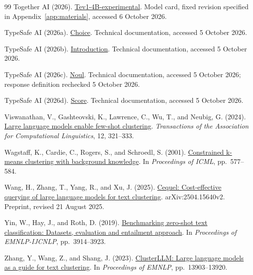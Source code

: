 \documentclass[UTF8,a4paper,zihao=-4,fontset=fandol]{ctexart}
\begin{document}
\begin{thebibliography}{99}
Together AI (2026).
\href{https://huggingface.co/togethercomputer/Tev1-4B-experimental/tree/0b7becf017daa0e5eb222f8ce7483c8c8259c52f}{Tev1-4B-experimental}.
Model card, fixed revision specified in Appendix~\ref{app:materials}, accessed 6 October 2026.

TypeSafe AI (2026a).
\href{https://docs.typesafe.ai/primitives/choice}{Choice}.
Technical documentation, accessed 5 October 2026.

TypeSafe AI (2026b).
\href{https://docs.typesafe.ai/introduction}{Introduction}.
Technical documentation, accessed 5 October 2026.

TypeSafe AI (2026c).
\href{https://docs.typesafe.ai/primitives/noul}{Noul}.
Technical documentation, accessed 5 October 2026; response definition rechecked 5 October 2026.

TypeSafe AI (2026d).
\href{https://docs.typesafe.ai/primitives/score}{Score}.
Technical documentation, accessed 5 October 2026.

Viswanathan, V., Gashteovski, K., Lawrence, C., Wu, T., and Neubig, G. (2024).
\href{https://doi.org/10.1162/tacl_a_00648}{Large language models enable few-shot clustering}.
\emph{Transactions of the Association for Computational Linguistics}, 12, 321--333.

Wagstaff, K., Cardie, C., Rogers, S., and Schroedl, S. (2001).
\href{https://www.cs.cmu.edu/~dgovinda/pdf/icml-2001.pdf}{Constrained k-means clustering with background knowledge}.
In \emph{Proceedings of ICML}, pp.~577--584.

Wang, H., Zhang, T., Yang, R., and Xu, J. (2025).
\href{https://arxiv.org/abs/2504.15640v2}{Cequel: Cost-effective querying of large language models for text clustering}.
arXiv:2504.15640v2. Preprint, revised 21 August 2025.

Yin, W., Hay, J., and Roth, D. (2019).
\href{https://doi.org/10.18653/v1/D19-1404}{Benchmarking zero-shot text classification: Datasets, evaluation and entailment approach}.
In \emph{Proceedings of EMNLP-IJCNLP}, pp.~3914--3923.

Zhang, Y., Wang, Z., and Shang, J. (2023).
\href{https://doi.org/10.18653/v1/2023.emnlp-main.858}{ClusterLLM: Large language models as a guide for text clustering}.
In \emph{Proceedings of EMNLP}, pp.~13903--13920.

\end{thebibliography}
\end{document}
